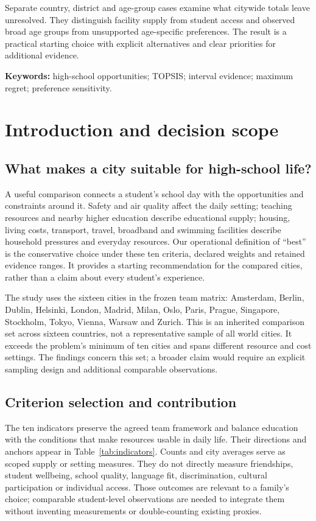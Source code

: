 Separate country, district and age-group cases examine what citywide totals
leave unresolved. They distinguish facility supply from student access and
observed broad age groups from unsupported age-specific preferences. The result
is a practical starting choice with explicit alternatives and clear priorities
for additional evidence.

\textbf{Keywords:} high-school opportunities; TOPSIS; interval evidence;
maximum regret; preference sensitivity.
\clearpage
\tableofcontents
\clearpage
\section{Introduction and decision scope}
\subsection{What makes a city suitable for high-school life?}
A useful comparison connects a student's school day with the opportunities and
constraints around it. Safety and air quality affect the daily setting; teaching
resources and nearby higher education describe educational supply; housing,
living costs, transport, travel, broadband and swimming facilities describe
household pressures and everyday resources. Our operational definition of
``best'' is the conservative choice under these ten criteria, declared weights
and retained evidence ranges. It provides a starting recommendation for the
compared cities, rather than a claim about every student's experience.

The study uses the sixteen cities in the frozen team matrix: Amsterdam, Berlin,
Dublin, Helsinki, London, Madrid, Milan, Oslo, Paris, Prague, Singapore,
Stockholm, Tokyo, Vienna, Warsaw and Zurich. This is an inherited comparison
set across sixteen countries, not a representative sample of all world cities.
It exceeds the problem's minimum of ten cities and spans different resource
and cost settings. The findings concern this set; a broader claim would require
an explicit sampling design and additional comparable observations.

\subsection{Criterion selection and contribution}
The ten indicators preserve the agreed team framework and balance education
with the conditions that make resources usable in daily life. Their directions
and anchors appear in Table~\ref{tab:indicators}. Counts and city averages serve
as scoped supply or setting measures. They do not directly measure friendships,
student wellbeing, school quality, language fit, discrimination, cultural
participation or individual access. Those outcomes are relevant to a family's
choice; comparable student-level observations are needed to integrate them
without inventing measurements or double-counting existing proxies.

